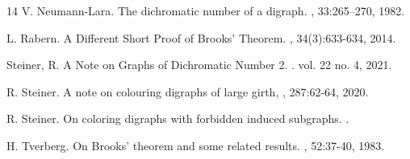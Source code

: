 \documentclass[11pt]{article}
\begin{document}
\begin{thebibliography}{14}
V. Neumann-Lara.
\newblock The dichromatic number of a digraph. 
, 33:265--270, 1982.


L. Rabern.
\newblock A Different Short Proof of Brooks’ Theorem.
,  34(3):633-634, 2014. 


Steiner, R.
\newblock A Note on Graphs of Dichromatic Number 2.
. vol. 22 no. 4, 2021.

R. Steiner. 
\newblock A note on colouring digraphs of large girth, 
, 287:62-64, 2020.

R. Steiner. 
\newblock On coloring digraphs with forbidden induced subgraphs.
. 

H. Tverberg.
\newblock On Brooks’ theorem and some related results.
, 52:37-40, 1983.

\end{thebibliography}
\end{document}
